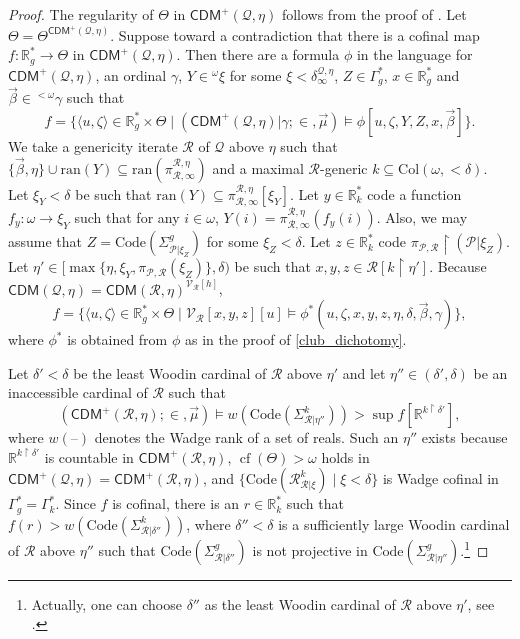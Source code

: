 \documentclass{amsart}
\renewcommand{\subset}{\subseteq}
\newcommand{\uphar}{\mathbin{\upharpoonright}}
\DeclareMathOperator{\cf}{cf}
\begin{document}
\begin{proof}
The regularity of $\Theta$ in $\mathsf{CDM}^+(\mathcal{Q}, \eta)$ follows from the proof of \cite[Theorem 1.3]{dm_of_self_it}.
Let $\Theta=\Theta^{\mathsf{CDM}^+(\mathcal{Q}, \eta)}$.
Suppose toward a contradiction that there is a cofinal map $f\colon\mathbb{R}^*_g\to\Theta$ in $\mathsf{CDM}^{+}(\mathcal{Q}, \eta)$.
Then there are a formula $\phi$ in the language for $\mathsf{CDM}^+(\mathcal{Q}, \eta)$, an ordinal $\gamma$, $Y\in {}^{\omega}\xi$ for some $\xi<\delta^{\mathcal{Q}, \eta}_{\infty}$, $Z\in\Gamma^*_g$, $x\in\mathbb{R}^*_g$ and $\vec{\beta}\in{}^{<\omega}\gamma$ such that
\[
f=\{\langle u, \zeta\rangle\in\mathbb{R}^*_g\times\Theta\mid(\mathsf{CDM}^+(\mathcal{Q}, \eta)\vert\gamma; {\in}, \vec{\mu})\models\phi[u, \zeta, Y, Z, x, \vec{\beta}]\}.
\]
We take a genericity iterate $\mathcal{R}$ of $\mathcal{Q}$ above $\eta$ such that $\{\vec{\beta}, \eta\}\cup\mathrm{ran}(Y)\subset\mathrm{ran}(\pi^{\mathcal{R}, \eta}_{\mathcal{R}, \infty})$ and a maximal $\mathcal{R}$-generic $k\subset\mathrm{Col}(\omega, {<}\delta)$.
Let $\xi_Y<\delta$ be such that $\mathrm{ran}(Y)\subset\pi^{\mathcal{R}, \eta}_{\mathcal{R}, \infty}[\xi_Y]$.
Let $y\in\mathbb{R}^*_{k}$ code a function $f_y\colon\omega\to\xi_Y$ such that for any $i\in\omega$, $Y(i)=\pi^{\mathcal{R}, \eta}_{\mathcal{R}, \infty}(f_y(i))$.
Also, we may assume that $Z=\mathrm{Code}(\Sigma^g_{\mathcal{P}\vert\xi_{Z}})$ for some $\xi_Z<\delta$.
Let $z\in\mathbb{R}^*_{k}$ code $\pi_{\mathcal{P}, \mathcal{R}}\uphar(\mathcal{P}\vert\xi_Z)$.
Let $\eta'\in[\max\{\eta, \xi_Y, \pi_{\mathcal{P}, \mathcal{R}}(\xi_Z)\}, \delta)$ be such that $x, y, z\in\mathcal{R}[k\uphar\eta']$.
Because $\mathsf{CDM}(\mathcal{Q}, \eta)=\mathsf{CDM}(\mathcal{R}, \eta)^{\mathcal{V}_{\mathcal{R}}[h]}$,
\[
f=\{\langle u, \zeta\rangle\in\mathbb{R}^*_g\times\Theta\mid\mathcal{V}_{\mathcal{R}}[x, y, z][u]\models\phi^*(u, \zeta, x, y, z, \eta, \delta, \vec{\beta}, \gamma)\},
\]
where $\phi^*$ is obtained from $\phi$ as in the proof of \cref{club_dichotomy}.

Let $\delta'<\delta$ be the least Woodin cardinal of $\mathcal{R}$ above $\eta'$ and let $\eta''\in(\delta', \delta)$ be an inaccessible cardinal of $\mathcal{R}$ such that
\[
(\mathsf{CDM}^+(\mathcal{R}, \eta); {\in}, \vec{\mu})\models w(\mathrm{Code}(\Sigma^k_{\mathcal{R}\vert\eta''}))>\sup f[\mathbb{R}^{k\uphar\delta'}],
\]
where $w(\text{--})$ denotes the Wadge rank of a set of reals.
Such an $\eta''$ exists because $\mathbb{R}^{k\uphar\delta'}$ is countable in $\mathsf{CDM}^+(\mathcal{R}, \eta)$, $\cf(\Theta)>\omega$ holds in $\mathsf{CDM}^+(\mathcal{Q}, \eta)=\mathsf{CDM}^+(\mathcal{R}, \eta)$, and $\{\mathrm{Code}(\mathcal{R}^k_{\mathcal{R}\vert\xi})\mid\xi<\delta\}$ is Wadge cofinal in $\Gamma^*_g=\Gamma^*_k$.
Since $f$ is cofinal, there is an $r\in\mathbb{R}^*_k$ such that $f(r)>w(\mathrm{Code}(\Sigma^k_{\mathcal{R}\vert\delta''}))$, where $\delta''<\delta$ is a sufficiently large Woodin cardinal of $\mathcal{R}$ above $\eta''$ such that $\mathrm{Code}(\Sigma^g_{\mathcal{R}\vert\delta''})$ is not projective in $\mathrm{Code}(\Sigma^g_{\mathcal{R}\vert\eta''})$.\footnote{Actually, one can choose $\delta''$ as the least Woodin cardinal of $\mathcal{R}$ above $\eta'$, see \cite[Lemma 3.4]{dm_of_self_it}.}


\end{proof}
\end{document}
